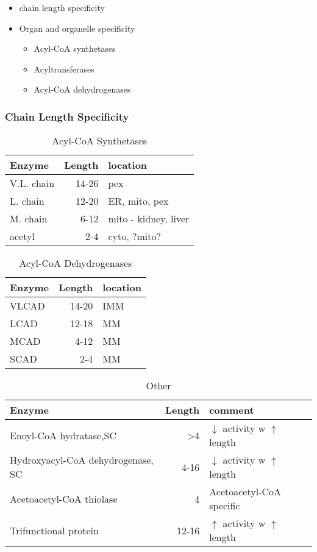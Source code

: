 \documentclass{scrartcl}
\begin{document}
\begin{itemize}
\item chain length specificity
\item Organ and organelle specificity
\begin{itemize}
\item Acyl-CoA synthetases
\item Acyltransferases
\item Acyl-CoA dehydrogenases
\end{itemize}
\end{itemize}


\subsubsection{Chain Length Specificity}
\label{sec:org825a447}

\begin{table}[htbp]
\caption{\label{tab:org721855c}
Acyl-CoA Synthetases}
\centering
\begin{tabular}{lrl}
Enzyme & Length & location\\
\hline
V.L. chain & 14-26 & pex\\
L. chain & 12-20 & ER, mito, pex\\
M. chain & 6-12 & mito - kidney, liver\\
acetyl & 2-4 & cyto, ?mito?\\
\end{tabular}
\end{table}


\begin{table}[htbp]
\caption{\label{tab:org39ae3dd}
Acyl-CoA Dehydrogenases}
\centering
\begin{tabular}{lrl}
Enzyme & Length & location\\
\hline
VLCAD & 14-20 & IMM\\
LCAD & 12-18 & MM\\
MCAD & 4-12 & MM\\
SCAD & 2-4 & MM\\
\end{tabular}
\end{table}


\begin{table}[htbp]
\caption{\label{tab:org3c6b5fd}
Other}
\centering
\begin{tabular}{lrl}
Enzyme & Length & comment\\
\hline
Enoyl-CoA hydratase,SC & >4 & \(\downarrow\) activity w \(\uparrow\) length\\
Hydroxyacyl-CoA dehydrogenase, SC & 4-16 & \(\downarrow\) activity w \(\uparrow\) length\\
Acetoacetyl-CoA thiolase & 4 & Acetoacetyl-CoA specific\\
Trifunctional protein & 12-16 & \(\uparrow\) activity w \(\uparrow\) length\\
\end{tabular}
\end{table}
\end{document}
